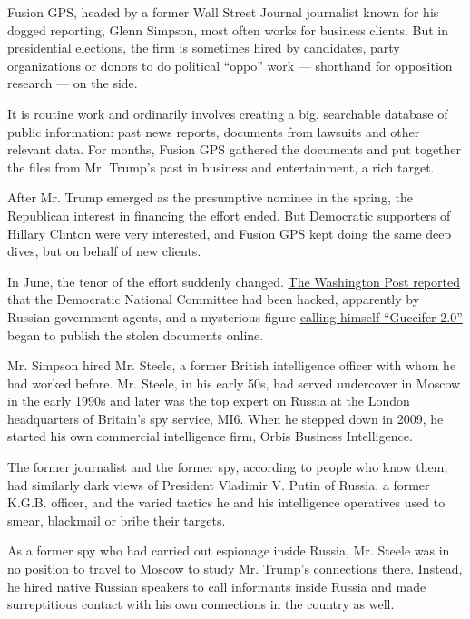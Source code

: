 Fusion GPS, headed by a former Wall Street Journal journalist known for
his dogged reporting, Glenn Simpson, most often works for business
clients. But in presidential elections, the firm is sometimes hired by
candidates, party organizations or donors to do political ``oppo'' work
--- shorthand for opposition research --- on the side.

It is routine work and ordinarily involves creating a big, searchable
database of public information: past news reports, documents from
lawsuits and other relevant data. For months, Fusion GPS gathered the
documents and put together the files from Mr. Trump's past in business
and entertainment, a rich target.

After Mr. Trump emerged as the presumptive nominee in the spring, the
Republican interest in financing the effort ended. But Democratic
supporters of Hillary Clinton were very interested, and Fusion GPS kept
doing the same deep dives, but on behalf of new clients.

In June, the tenor of the effort suddenly changed.
\href{https://www.washingtonpost.com/world/national-security/russian-government-hackers-penetrated-dnc-stole-opposition-research-on-trump/2016/06/14/cf006cb4-316e-11e6-8ff7-7b6c1998b7a0_story.html}{The
Washington Post reported} that the Democratic National Committee had
been hacked, apparently by Russian government agents, and a mysterious
figure
\href{https://www.nytimes.com/2016/07/28/us/politics/is-dnc-email-hacker-a-person-or-a-russian-front-experts-arent-sure.html}{calling
himself ``Guccifer 2.0''} began to publish the stolen documents online.

Mr. Simpson hired Mr. Steele, a former British intelligence officer with
whom he had worked before. Mr. Steele, in his early 50s, had served
undercover in Moscow in the early 1990s and later was the top expert on
Russia at the London headquarters of Britain's spy service, MI6. When he
stepped down in 2009, he started his own commercial intelligence firm,
Orbis Business Intelligence.

The former journalist and the former spy, according to people who know
them, had similarly dark views of President Vladimir V. Putin of Russia,
a former K.G.B. officer, and the varied tactics he and his intelligence
operatives used to smear, blackmail or bribe their targets.

As a former spy who had carried out espionage inside Russia, Mr. Steele
was in no position to travel to Moscow to study Mr. Trump's connections
there. Instead, he hired native Russian speakers to call informants
inside Russia and made surreptitious contact with his own connections in
the country as well.


